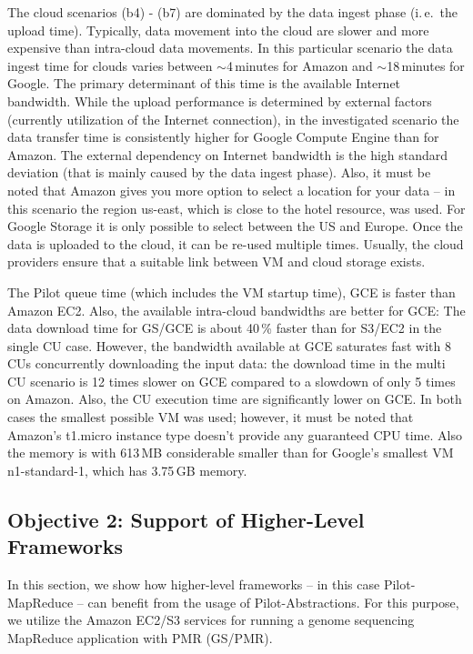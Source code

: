 \documentclass[times]{cpeauth}
\newcommand{\pilot}{Pilot\xspace}
\newcommand{\cu}{CU\xspace}
\newcommand{\cus}{CUs\xspace}
\begin{document}
The cloud scenarios (b4) - (b7) are dominated by the data ingest phase
(i.\,e.\ the upload time). Typically, data movement into the cloud are slower
and more expensive than intra-cloud data movements. In this particular
scenario the data ingest time for clouds varies between $\sim$4\,minutes for
Amazon and $\sim$18\,minutes for Google. The primary determinant of this time
is the available Internet bandwidth. While the upload performance is
determined by external factors (currently utilization of the Internet
connection), in the investigated scenario the data transfer time is
consistently higher for Google Compute Engine than for Amazon. The external
dependency on Internet bandwidth is the high standard deviation (that is
mainly caused by the data ingest phase). Also, it must be noted that Amazon
gives you more option to select a location for your data -- in this scenario
the region us-east, which is close to the hotel resource, was used. For Google
Storage it is only possible to select between the US and Europe. Once the data
is uploaded to the cloud, it can be re-used multiple times. Usually, the cloud 
providers ensure that a suitable link between VM and cloud storage exists.

The \pilot queue time (which includes the VM startup time), GCE is faster than
Amazon EC2. Also, the available intra-cloud bandwidths are better for GCE: The
data download time for GS/GCE is about 40\,\% faster than for S3/EC2 in the
single \cu case. However, the bandwidth available at GCE saturates fast with
8\,\cus concurrently downloading the input data: the download time in the
multi \cu scenario is 12 times slower on GCE compared to a slowdown of only 5
times on Amazon. Also, the \cu execution time are significantly lower on GCE.
In both cases the smallest possible VM was used; however, it must be noted
that Amazon's t1.micro instance type doesn't provide any guaranteed CPU time.
Also the memory is with 613\,MB considerable smaller than for Google's
smallest VM n1-standard-1, which has 3.75\,GB memory.




\subsection{Objective 2: Support of Higher-Level Frameworks}

In this section, we show how higher-level frameworks -- in this case
Pilot-MapReduce -- can benefit from the usage of \pilot-Abstractions. For this
purpose, we utilize the Amazon EC2/S3 services for running a genome sequencing 
MapReduce application with PMR (GS/PMR). 
\end{document}
